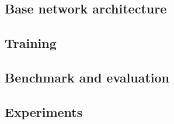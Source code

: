 \subsection{Base network architecture}



\subsection{Training}


\subsection{Benchmark and evaluation}


\subsection{Experiments}

